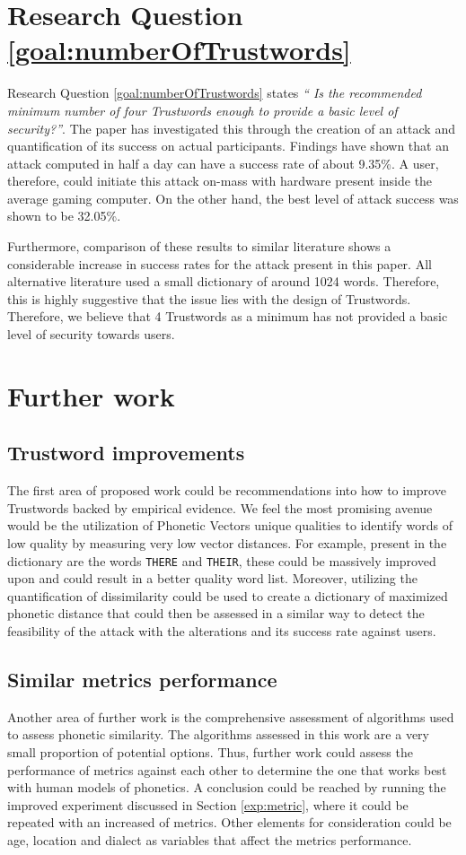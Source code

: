\section{Research Question \ref{goal:numberOfTrustwords}}
Research Question \ref{goal:numberOfTrustwords} states \textit{`` Is the recommended minimum number of four Trustwords enough to provide a basic level of security?''}. The paper has investigated this through the creation of an attack and quantification of its success on actual participants. Findings have shown that an attack computed in half a day can have a success rate of about 9.35\%. A user, therefore, could initiate this attack on-mass with hardware present inside the average gaming computer. On the other hand, the best level of attack success was shown to be 32.05\%. 

Furthermore, comparison of these results to similar literature shows a considerable increase in success rates for the attack present in this paper. All alternative literature used a small dictionary of around 1024 words. Therefore, this is highly suggestive that the issue lies with the design of Trustwords. Therefore, we believe that 4 Trustwords as a minimum has not provided a basic level of security towards users.

\section{Further work}

\subsection*{Trustword improvements}
The first area of proposed work could be recommendations into how to improve Trustwords backed by empirical evidence. We feel the most promising avenue would be the utilization of Phonetic Vectors unique qualities to identify words of low quality by measuring very low vector distances. For example, present in the dictionary are the words \verb|THERE| and \verb|THEIR|, these could be massively improved upon and could result in a better quality word list. Moreover, utilizing the quantification of dissimilarity could be used to create a dictionary of maximized phonetic distance that could then be assessed in a similar way to detect the feasibility of the attack with the alterations and its success rate against users.

\subsection*{Similar metrics performance}
Another area of further work is the comprehensive assessment of algorithms used to assess phonetic similarity. The algorithms assessed in this work are a very small proportion of potential options. Thus, further work could assess the performance of metrics against each other to determine the one that works best with human models of phonetics. A conclusion could be reached by running the improved experiment discussed in Section \ref{exp:metric}, where it could be repeated with an increased of metrics. Other elements for consideration could be age, location and dialect as variables that affect the metrics performance. 

